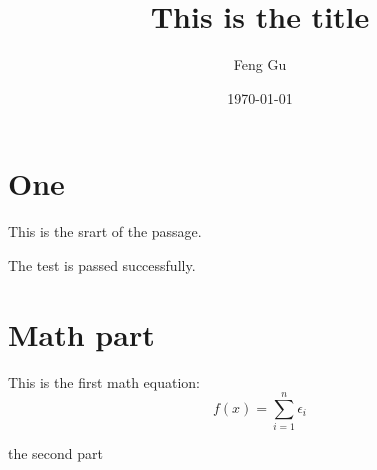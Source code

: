 \documentclass{article}
\title{This is the title}
\author{Feng Gu}
\date{\today}
\begin{document}
\maketitle


\section{One}
This is the srart of the passage.


The test is passed successfully.


\section{Math part}

This is the first math equation:
\[
f(x) = \sum_{i=1}^{n} \epsilon_i
\]

the second part
\end{document}
